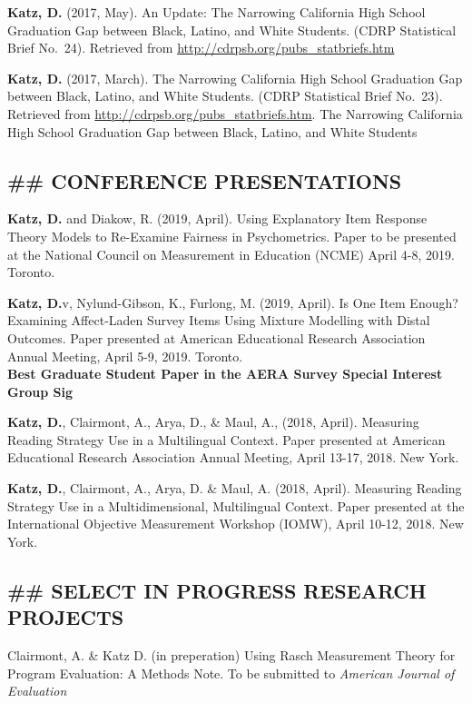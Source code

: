 \documentclass[]{article}
\begin{document}
\textbf{Katz, D.} (2017, May). An Update: The Narrowing California High
School Graduation Gap between Black, Latino, and White Students. (CDRP
Statistical Brief No.~24). Retrieved from
\url{http://cdrpsb.org/pubs_statbriefs.htm}

\textbf{Katz, D.} (2017, March). The Narrowing California High School
Graduation Gap between Black, Latino, and White Students. (CDRP
Statistical Brief No.~23). Retrieved from
\url{http://cdrpsb.org/pubs_statbriefs.htm}. The Narrowing California
High School Graduation Gap between Black, Latino, and White Students

\hypertarget{conference-presentations}{%
\subsection{\#\# CONFERENCE
PRESENTATIONS}\label{conference-presentations}}

\textbf{Katz, D.} and Diakow, R. (2019, April). Using Explanatory Item
Response Theory Models to Re-Examine Fairness in Psychometrics. Paper to
be presented at the National Council on Measurement in Education (NCME)
April 4-8, 2019. Toronto.

\textbf{Katz, D.}v, Nylund-Gibson, K., Furlong, M. (2019, April). Is One
Item Enough? Examining Affect-Laden Survey Items Using Mixture Modelling
with Distal Outcomes. Paper presented at American Educational Research
Association Annual Meeting, April 5-9, 2019. Toronto.\\
\textbf{Best Graduate Student Paper in the AERA Survey Special Interest
Group Sig}

\textbf{Katz, D.}, Clairmont, A., Arya, D., \& Maul, A., (2018, April).
Measuring Reading Strategy Use in a Multilingual Context. Paper
presented at American Educational Research Association Annual Meeting,
April 13-17, 2018. New York.

\textbf{Katz, D.}, Clairmont, A., Arya, D. \& Maul, A. (2018, April).
Measuring Reading Strategy Use in a Multidimensional, Multilingual
Context. Paper presented at the International Objective Measurement
Workshop (IOMW), April 10-12, 2018. New York.

\hypertarget{select-in-progress-research-projects}{%
\subsection{\#\# SELECT IN PROGRESS RESEARCH
PROJECTS}\label{select-in-progress-research-projects}}

Clairmont, A. \& Katz D. (in preperation) Using Rasch Measurement Theory
for Program Evaluation: A Methods Note. To be submitted to
\emph{American Journal of Evaluation}
\end{document}
